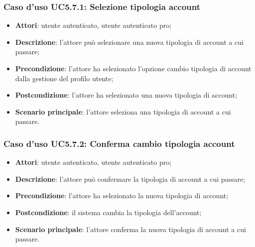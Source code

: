 \subsubsection{Caso d'uso UC5.7.1: Selezione tipologia account}

\begin{itemize}
	\item \textbf{Attori}: utente autenticato, utente autenticato pro;
	\item \textbf{Descrizione}: l'attore può selezionare una nuova tipologia di account a cui passare;
	\item \textbf{Precondizione}: l'attore ha selezionato l'opzione cambio tipologia di account dalla gestione del profilo utente;
	\item \textbf{Postcondizione}: l'attore ha selezionato  una nuova tipologia di account;
	\item \textbf{Scenario principale}: l'attore seleziona una tipologia di account a cui passare.
\end{itemize}

\subsubsection{Caso d'uso UC5.7.2: Conferma cambio tipologia account}

\begin{itemize}
	\item \textbf{Attori}: utente autenticato, utente autenticato pro;
	\item \textbf{Descrizione}: l'attore può confermare la tipologia di account a cui passare;
	\item \textbf{Precondizione}: l'attore ha selezionato la nuova tipologia di account;
	\item \textbf{Postcondizione}: il sistema cambia la tipologia dell'account;
	\item \textbf{Scenario principale}: l'attore conferma la nuova tipologia di account a cui passare.
\end{itemize}

